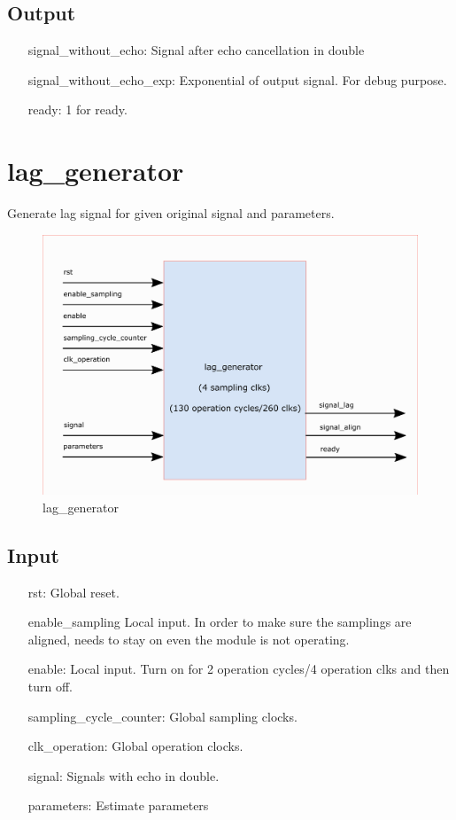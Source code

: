 \documentclass[twoside,a4paper]{refart}
\begin{document}
\subsection{Output}
\begin{itemize}
	\item[signal\_without\_echo:] Signal after echo cancellation in double
	\item[signal\_without\_echo\_exp:] Exponential of output signal. For debug purpose.
	\item[ready:] 1 for ready.
\end{itemize}
\section{lag\_generator}
Generate lag signal for given original signal and parameters.
\begin{figure}[H]
	\centering
	\includegraphics[scale=1.2]{lag_generator.png}
	\caption{lag\_generator}
	\label{}
\end{figure}
\subsection{Input}
\begin{itemize}
	\item[rst:      ] Global reset.
	\item[enable\_sampling] Local input. In order to make sure the samplings are aligned, needs to stay on even the module is not operating.
	\item[enable:] Local input. Turn on for 2 operation cycles/4 operation clks and then turn off.
	\item[sampling\_cycle\_counter:] Global sampling clocks.
	\item[clk\_operation:] Global operation clocks.
	\item[signal:] Signals with echo in double.
	\item[parameters:] Estimate parameters
\end{itemize}
\end{document}
